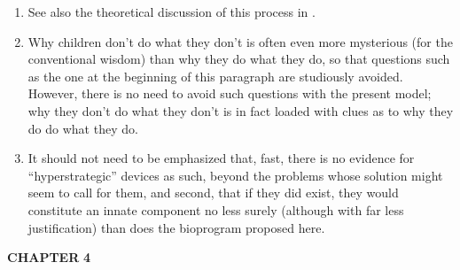 \begin{enumerate}
\item See also the theoretical discussion of this process in \citet{Bickerton1980}.
\item Why children don't do what they don't is often even more 
mysterious (for the conventional wisdom) than why they do what they do, so that questions such as the one at the beginning of this paragraph are studiously avoided. However, there is no need to avoid such questions with the present model; why they don't do what they don't is in fact loaded with clues as to why they do do what they do.

\item It should not need to be emphasized that, fast, there is no evidence for ``hyperstrategic'' devices as such, beyond the problems whose solution might seem to call for them, and second, that if they did exist, they would constitute an innate component no less surely (although with far less justification) than does the bioprogram proposed here.
\end{enumerate}

\textbf{CHAPTER} \textbf{4}


